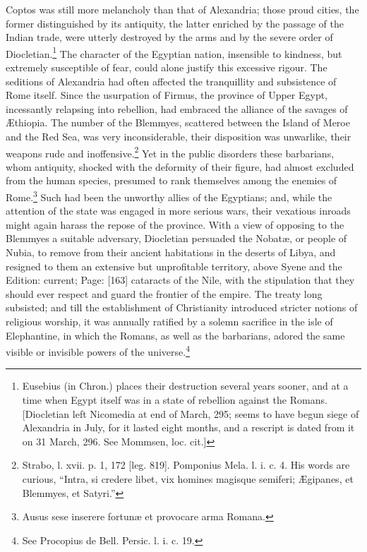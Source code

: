 Coptos was still more melancholy than that of Alexandria; those proud cities, the former distinguished by its antiquity, the latter enriched by the passage of the Indian trade, were utterly destroyed by the arms and by the severe order of Diocletian.\footnote{Eusebius (in Chron.) places their destruction several years sooner, and at a time when Egypt itself was in a state of rebellion against the Romans. [Diocletian left Nicomedia at end of March, 295; seems to have begun siege of Alexandria in July, for it lasted eight months, and a rescript is dated from it on 31 March, 296. See Mommsen, loc. cit.]} The character of the Egyptian nation, insensible to kindness, but extremely susceptible of fear, could alone justify this excessive rigour. The seditions of Alexandria had often affected the tranquillity and subsistence of Rome itself. Since the usurpation of Firmus, the province of Upper Egypt, incessantly relapsing into rebellion, had embraced the alliance of the savages of Æthiopia. The number of the Blemmyes, scattered between the Island of Meroe and the Red Sea, was very inconsiderable, their disposition was unwarlike, their weapons rude and inoffensive.\footnote{Strabo, l. xvii. p. 1, 172 [leg. 819]. Pomponius Mela. l. i. c. 4. His words are curious, \texthebrew{“}Intra, si credere libet, vix homines magisque semiferi; Ægipanes, et Blemmyes, et Satyri.\texthebrew{}”} Yet in the public disorders these barbarians, whom antiquity, shocked with the deformity of their figure, had almost excluded from the human species, presumed to rank themselves among the enemies of Rome.\footnote{Ausus sese inserere fortunæ et provocare arma Romana.} Such had been the unworthy allies of the Egyptians; and, while the attention of the state was engaged in more serious wars, their vexatious inroads might again harass the repose of the province. With a view of opposing to the Blemmyes a suitable adversary, Diocletian persuaded the Nobatæ, or people of Nubia, to remove from their ancient habitations in the deserts of Libya, and resigned to them an extensive but unprofitable territory, above Syene and the Edition: current; Page: [163] cataracts of the Nile, with the stipulation that they should ever respect and guard the frontier of the empire. The treaty long subsisted; and till the establishment of Christianity introduced stricter notions of religious worship, it was annually ratified by a solemn sacrifice in the isle of Elephantine, in which the Romans, as well as the barbarians, adored the same visible or invisible powers of the universe.\footnote{See Procopius de Bell. Persic. l. i. c. 19.}

